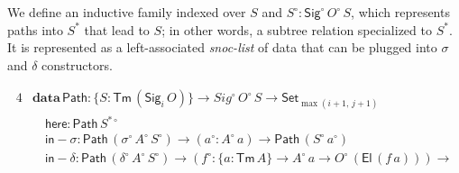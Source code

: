 \documentclass[acmsmall,screen,review,anonymous]{acmart}
\newcommand{\msf}[1]{{\mathsf{#1}}}
\newcommand{\mbf}[1]{{\mathbf{#1}}}
\newcommand{\data}{\mbf{data}}
\newcommand{\Set}{\msf{Set}}
\newcommand{\El}{\msf{El}}
\newcommand{\Sig}{\msf{Sig}}
\newcommand{\blank}{{\mathord{\hspace{1pt}\text{--}\hspace{1pt}}}}
\newcommand{\Tm}{\msf{Tm}}
\newcommand{\w}{\circ}
\newcommand{\SigElim}{\msf{SigElim}}
\newcommand{\Path}{\msf{Path}}
\newcommand{\here}{\msf{here}}
\newcommand{\Ssw}{S^{*\w}}
\newcommand{\insigma}{\msf{in}\!\!-\!\!\sigma}
\newcommand{\indelta}{\msf{in}\!\!-\!\!\delta}
\begin{document}
\begin{definition} We define an inductive family indexed
over $S$ and $S^\w : \Sig^\w\,O^\w\,S$, which represents paths into $S^*$ that lead to $S$; in other
words, a subtree relation specialized to $S^*$. It is represented as a left-associated
\emph{snoc-list} of data that can be plugged into $\sigma$ and $\delta$ constructors.

\begin{alignat*}{4}
  &\data\,\Path : \{S : \Tm\,(\Sig_i\,O)\} \to Sig^\w\,O^\w\,S \to \Set_{\max(i+1,\,j+1)}\\
  &\quad \here    : \Path\,\Ssw\\
  &\quad \insigma : \Path\,(\sigma^\w\,A^\w\,S^\w) \to (a^\w : A^\w\,a) \to \Path\,(S^\w\,a^\w) \\
  &\quad \indelta : \Path\,(\delta^\w\,A^\w\,S^\w) \to (f^\w : \{a : \Tm\,A\} \to A^\w\,a \to O^\w\,(\El\,(f\,a))) \to
\end{alignat*}


\end{definition}







\end{document}
